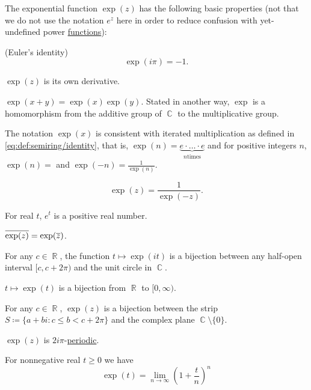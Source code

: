 \begin{proposition}\label{thm:def:exponential_function}
  The exponential function \( \exp(z) \) has the following basic properties (not that we do not use the notation \( e^z \) here in order to reduce confusion with yet-undefined power \hyperref[def:power_function]{functions}):

  \begin{thmenum}
     (Euler's identity)
    \begin{equation*}
      \exp(i \pi) = -1.
    \end{equation*}

     \( \exp(z) \) is its own derivative.

     \( \exp(x + y) = \exp(x) \exp(y) \). Stated in another way, \( \exp \) is a homomorphism from the additive group of \( \BbbC \) to the multiplicative group.

     The notation \( \exp(x) \) is consistent with iterated multiplication as defined in \eqref{eq:def:semiring/identity}, that is, \( \exp(n) = \underbrace{e \cdot \ldots \cdot e}_{n \text{times}} \) and for positive integers \( n \), \( \exp(n) =  \) and \( \exp(-n) =\tfrac 1 {\exp(n)} \).

    \begin{equation*}
      \exp(z) = \frac 1 {\exp(-z)}.
    \end{equation*}

     For real \( t \), \( e^t \) is a positive real number.

     \( \oline{\exp(z)} = \exp(\oline{z}) \).

     For any \( c \in \BbbR \), the function \( t \mapsto \exp(it) \) is a bijection between any half-open interval \( [c, c + 2\pi) \) and the unit circle in \( \BbbC \).

     \( t \mapsto \exp(t) \) is a bijection from \( \BbbR \) to \( [0, \infty) \).

     For any \( c \in \BbbR \), \( \exp(z) \) is a bijection between the strip \( S \coloneqq \{ a + bi \colon c \leq b < c + 2\pi \} \) and the complex plane \( \BbbC \setminus \{ 0 \} \).

     \( \exp(z) \) is \( 2i\pi \)-\hyperref[def:periodic_function]{periodic}.

     For nonnegative real \( t \geq 0 \) we have
    \begin{equation*}
      \exp(t) = \lim_{n \to \infty} \left(1 + \frac t n \right)^n
    \end{equation*}
  \end{thmenum}
\end{proposition}
